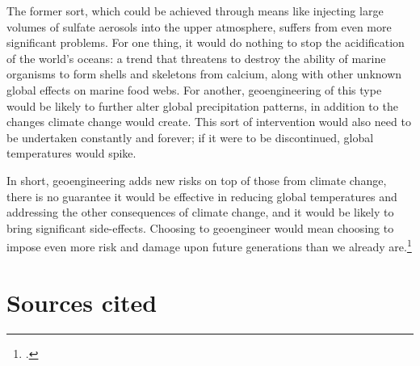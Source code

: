 \documentclass[10pt]{article}
\begin{document}
The former sort, which could be achieved through means like injecting large volumes of sulfate aerosols into the upper atmosphere, suffers from even more significant problems.
For one thing, it would do nothing to stop the acidification of the world's oceans: a trend that threatens to destroy the ability of marine organisms to form shells and skeletons from calcium, along with other unknown global effects on marine food webs.
For another, geoengineering of this type would be likely to further alter global precipitation patterns, in addition to the changes climate change would create.
This sort of intervention would also need to be undertaken constantly and forever; if it were to be discontinued, global temperatures would spike.



In short, geoengineering adds new risks on top of those from climate change, there is no guarantee it would be effective in reducing global temperatures and addressing the other consequences of climate change, and it would be likely to bring significant side-effects.
Choosing to geoengineer would mean choosing to impose even more risk and damage upon future generations than we already are.\footcite[See: ][]{GardinerGeoeng}










\clearpage



	\singlespacing
	\section{Sources cited}
	\label{sec:Sources}
	\doublespacing



\nocite{DoreDisaster}



\printbibliography






\end{document}
